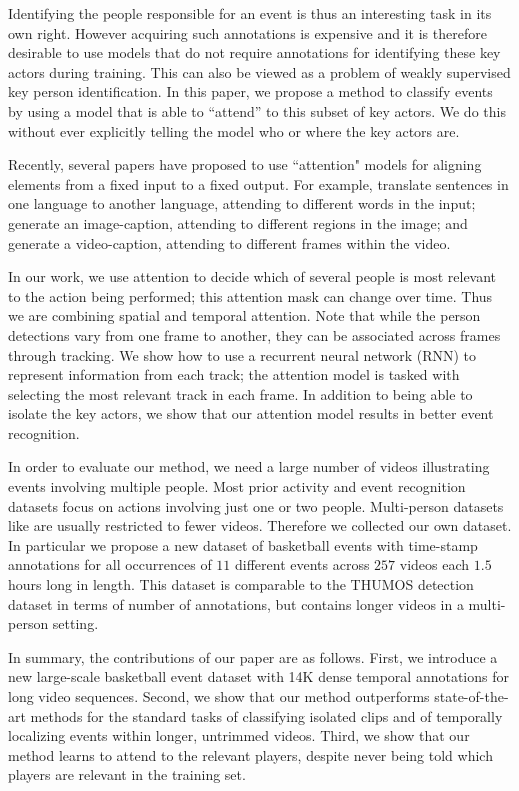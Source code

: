 Identifying the people responsible for an event is thus an interesting task in its
own right.  However acquiring such annotations is expensive and it is therefore
desirable to use models that do not require
annotations for identifying these key actors during training. This can
also be viewed as a problem of weakly supervised key person identification. In
this paper, we propose a method  to classify events by using a model that is
able to ``attend'' to this subset of key actors.  We  do this without ever
explicitly telling the model who or where the key actors are.

Recently, several papers have proposed to use ``attention" models for aligning
elements from a fixed input to a fixed output.  For example,
\cite{Bahdnau_arxiv14} translate sentences in one language to another language,
attending to different words in the input; \cite{Xu_arxiv15} generate an image-caption,
attending to different regions in the image; and
\cite{Yao_arxiv15} generate a video-caption, attending to different
frames within the video.


In our work, we use attention to decide which of several people is most
relevant to the action being performed; this attention mask can change over
time. Thus we are combining spatial and temporal attention.  Note that while
the person detections vary from one frame to another, they can be associated
across frames through tracking. We show how to use a recurrent neural
network (RNN) to represent information from each track;
the attention model is tasked with selecting the most relevant
track in each frame. In addition to being able to isolate the key actors,
we show that our attention model results in better event recognition.

In order to evaluate our method, we need a large number of videos illustrating
events involving multiple people. Most prior activity and event
recognition datasets focus on actions involving just one or two people.
Multi-person datasets like \cite{Ryoo_ICCV09,VIRAT,Choi_ICCV09} are usually restricted to fewer videos.
Therefore we collected our own dataset.
In particular we propose a new dataset of basketball events with time-stamp annotations for
all occurrences of $11$ different events across $257$ videos each $1.5$ hours
long in length.  This dataset is comparable to the THUMOS \cite{THUMOS}
detection dataset in terms of number of annotations, but contains longer videos
in a multi-person setting.

In summary, the contributions of our paper are as follows.  First, we
introduce a new  large-scale basketball event dataset with 14K dense temporal
annotations for long video sequences.  Second, we show that our method
outperforms state-of-the-art methods for the standard tasks of classifying
isolated clips and of temporally localizing events within longer, untrimmed
videos.  Third, we show that our method learns to attend to the relevant
players, despite never being told which players are relevant in the training
set.
